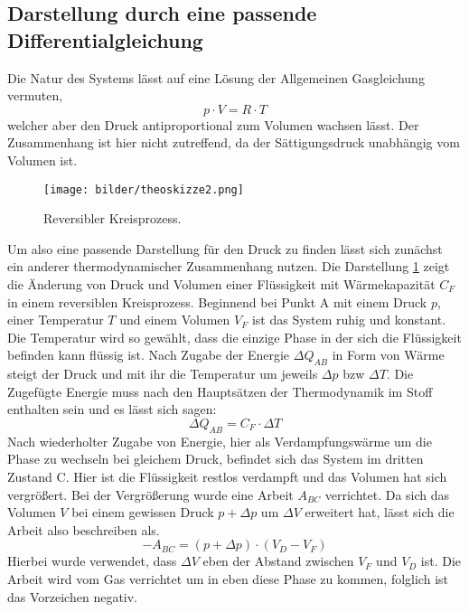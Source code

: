 \subsection{Darstellung durch eine passende Differentialgleichung}
Die Natur des Systems lässt auf eine Lösung der Allgemeinen Gasgleichung vermuten,
\begin{equation}
    \label{eqn:gas}
    p \cdot V = R \cdot T
\end{equation}
welcher aber den Druck antiproportional zum Volumen wachsen lässt. Der Zusammenhang ist hier nicht zutreffend, da der Sättigungsdruck unabhängig vom Volumen ist.
\begin{figure}
    \centering
    \texttt{[image: bilder/theoskizze2.png]}
    \caption{Reversibler Kreisprozess. \cite{skript}} 
    \label{fig:figtheo2}
\end{figure}
Um also eine passende Darstellung für den Druck zu finden lässt sich zunächst ein anderer thermodynamischer Zusammenhang nutzen. 
Die Darstellung \ref{fig:figtheo2} zeigt die Änderung von Druck und Volumen einer Flüssigkeit mit Wärmekapazität $C_F$ in einem reversiblen Kreisprozess.
Beginnend bei Punkt A mit einem Druck $p$, einer Temperatur $T$ und einem Volumen $V_F$ ist das System ruhig und konstant. Die Temperatur wird so
gewählt, dass die einzige Phase in der sich die Flüssigkeit befinden kann flüssig ist.
Nach Zugabe der Energie $\Delta Q_{AB}$ in Form von Wärme steigt der Druck und mit ihr die Temperatur um jeweils $\Delta p$ bzw $\Delta T$.
Die Zugefügte Energie muss nach den Hauptsätzen der Thermodynamik im Stoff enthalten sein und es lässt sich sagen:
\begin{equation}
    \Delta Q_{AB} = C_F \cdot \Delta T
\end{equation}
Nach wiederholter Zugabe von Energie, hier als Verdampfungswärme um die Phase zu wechseln bei gleichem Druck, befindet sich das System im dritten Zustand
C. Hier ist die Flüssigkeit restlos verdampft und das Volumen hat sich vergrößert. Bei der Vergrößerung wurde eine Arbeit $A_{BC}$ verrichtet. 
Da sich das Volumen $V$ bei einem gewissen Druck $p +\Delta p$ um $\Delta V$ erweitert hat, lässt sich die Arbeit also beschreiben als.
\begin{equation}
\label{eqn:BC}
    -A_{BC} = (p+ \Delta p) \cdot (V_D-V_F)
\end{equation}
Hierbei wurde verwendet, dass $\Delta V$ eben der Abstand zwischen $V_F$ und $V_D$ ist. Die Arbeit wird vom Gas verrichtet um in eben diese Phase
zu kommen, folglich ist das Vorzeichen negativ. \\
